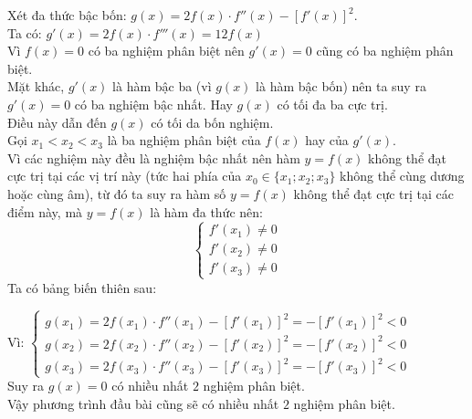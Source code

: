 \begin{Solbook}{17}
 \par \noindent  Xét đa thức bậc bốn: $g(x)=2f(x)\cdot f''(x)-\left [f'(x)\right ]^2$. \\ Ta có: $g'(x)=2f(x)\cdot f'''(x)=12f(x)$\\ Vì $f(x)=0$ có ba nghiệm phân biệt nên $g'(x)=0$ cũng có ba nghiệm phân biệt. \\ Mặt khác, $g'(x)$ là hàm bậc ba (vì $g(x)$ là hàm bậc bốn) nên ta suy ra $g'(x)=0$ có ba nghiệm bậc nhất. Hay $g(x)$ có tối đa ba cực trị. \\ Điều này dẫn đến $g(x)$ có tối da bốn nghiệm. \\ Gọi $x_1<x_2<x_3$ là ba nghiệm phân biệt của $f(x)$ hay của $g'(x)$. \\ Vì các nghiệm này đều là nghiệm bậc nhất nên hàm $y=f(x)$ không thể đạt cực trị tại các vị trí này (tức hai phía của $x_0 \in \{x_1;x_2;x_3\}$ không thể cùng dương hoặc cùng âm), từ đó ta suy ra hàm số $y=f(x)$ không thể đạt cực trị tại các điểm này, mà $y=f(x)$ là hàm đa thức nên: $$\begin {cases} f'(x_1) \ne 0 \\ f'(x_2) \ne 0 \\ f'(x_3) \ne 0 \end {cases}$$ Ta có bảng biến thiên sau: \begin {center}  \end {center} Vì: $\begin {cases} g(x_1)=2f(x_1)\cdot f''(x_1)-\left [f'(x_1)\right ]^2=-\left [f'(x_1)\right ]^2 <0\\ g(x_2)=2f(x_2)\cdot f''(x_2)-\left [f'(x_2)\right ]^2=-\left [f'(x_2)\right ]^2 <0\\ g(x_3)=2f(x_3)\cdot f''(x_3)-\left [f'(x_3)\right ]^2=-\left [f'(x_3)\right ]^2 <0 \end {cases}$\\ Suy ra $g(x)=0$ có nhiều nhất $2$ nghiệm phân biệt. \\ Vậy phương trình đầu bài cũng sẽ có nhiều nhất $2$ nghiệm phân biệt.  \par \noindent \selectB \hfill \qedEX 
\end{Solbook}
